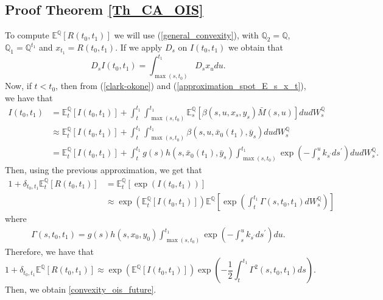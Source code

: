 \documentclass[a4paper,10pt]{article}
\newcommand{\1}{\mathbf{1}}
\begin{document}
\subsection{Proof Theorem \ref{Th_CA_OIS}}\label{Proof_CA_OIS_futures}
To compute $\mathbb{E}^{\mathbb{Q}}\left[R(t_0,t_1)\right]$ we will use (\ref{general_convexity}), with $\mathbb{Q}_2 = \mathbb{Q}$, $\mathbb{Q}_1 = \mathbb{Q}^{t_1}$ and $x_{t_1}=R(t_0,t_1)$. If we apply $D_s$ on $I(t_0,t_1)$ we obtain that
\begin{equation*}
D_s I(t_0,t_1) = \int_{\max(s, t_{0})}^{t_1}  D_s x_u du.
\end{equation*}
Now, if $t < t_0$, then from (\ref{clark-okone}) and (\ref{approximation_spot_E_s_x_t}), we have that 
\begin{align}\label{apprx_I_t0_t1}
I(t_0,t_1) &= \mathbb{E}_t^{\mathbb{Q}}\left[I(t_0,t_1)\right] + \int_{t}^{t_1}\int_{\max(s, t_{0})}^{t_1}  \mathbb{E}_s^{\mathbb{Q}}\left[\beta(s,u,x_s,y_s) \bar{M}(s,u) \right] du dW_s^{\mathbb{Q}} \nonumber \\
&\approx \mathbb{E}_t^{\mathbb{Q}}\left[I(t_0,t_1)\right] + \int_{t}^{t_1}\int_{\max(s, t_{0})}^{t_1} \beta(s,u,\bar{x}_0(t_1),\bar{y}_s) du dW_s^{\mathbb{Q}}\nonumber \\
&= \mathbb{E}_t^{\mathbb{Q}}\left[I(t_0,t_1)\right] + \int_{t}^{t_1} g(s)h(s,\bar{x}_0(t_1),\bar{y}_s)\int_{\max(s, t_{0})}^{t_1} \exp\left( -\int_{s}^{u} k_{s^{\prime}} ds^{\prime}\right) du dW_s^{\mathbb{Q}}.
\end{align}
Then, using the previous approximation, we get that
\begin{align*}
1 + \delta_{t_0,t_1}\mathbb{E}_t^{\mathbb{Q}}\left[R(t_0,t_1)\right] &= \mathbb{E}_t^{\mathbb{Q}}\left[ \exp(I(t_0,t_1)) \right]\\
&\approx \exp\left(\mathbb{E}_t^{\mathbb{Q}}\left[I(t_0,t_1)\right]\right)  \mathbb{E}^{\mathbb{Q}}\left[\exp\left(\int_{t}^{t_1} \Gamma(s,t_0,t_1)dW_s^{\mathbb{Q}}\right)\right]
\end{align*}
where 
\begin{align*}
\Gamma(s,t_0,t_1)= g(s)h(s,x_0,y_0)\int_{\max(s, t_{0})}^{t_1} \exp\left( -\int_{s}^{u} k_{s^{\prime}} ds^{\prime}\right)du.
\end{align*}
Therefore, we have that
\begin{equation}\label{representation_i_0_t}
1 + \delta_{t_0,t_1}\mathbb{E}^{\mathbb{Q}}\left[R(t_0,t_1)\right] \approx \exp\left(\mathbb{E}^{\mathbb{Q}}\left[I(t_0,t_1)\right]\right)\exp\left(-\frac{1}{2}\int_{t}^{t_1}\Gamma^{2}(s,t_0,t_1) ds\right).
\end{equation}
Then, we obtain \eqref{convexity_ois_future}.\\
\end{document}
